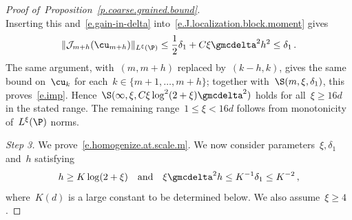 \documentclass[11pt]{amsart}
\begin{document}
\begin{proof}[{Proof of~Proposition~\ref{p.coarse.grained.bound}}]
\begin{equation*}
\end{equation*}
Inserting this and~\eqref{e.gain-in-delta} into~\eqref{e.J.localization.block.moment} gives
\begin{equation*}
	\|\mathcal J_{m+h}(\cu_{m+h})\|_{L^\xi(\P)}
	\leq
	\frac12 \delta_1 + C\xi \gmcdelta^2 h^2
	\leq \delta_1
	\,.
\end{equation*}
The same argument, with~$(m,m+h)$ replaced by~$(k-h,k)$, gives the same bound on~$\cu_k$ for each~$k\in\{m+1,\ldots,m+h\}$; together with~$\S(m,\xi,\delta_1)$, this proves~\eqref{e.imp}. Hence~$\S(\infty,\xi,C\xi\log^2(2+\xi)\gmcdelta^2)$ holds for all~$\xi\geq16d$ in the stated range. The remaining range~$1\leq\xi<16d$ follows from monotonicity of~$L^\xi(\P)$ norms.

\smallskip

\emph{Step 3.} We prove~\eqref{e.homogenize.at.scale.m}. We now consider parameters~$\xi,\delta_1$ and~$h$ satisfying
\begin{equation}
	h \geq K \log(2+\xi)
	\quad \text{and} \quad
	\xi \gmcdelta^2  h \leq K^{-1} \delta_1 \leq K^{-2} \,,
	\label{e.params.second.induction.step}
\end{equation}
where~$K(d)$ is a large constant to be determined below. We also assume~$\xi\geq 4$.

\smallskip


\end{proof}
\end{document}
